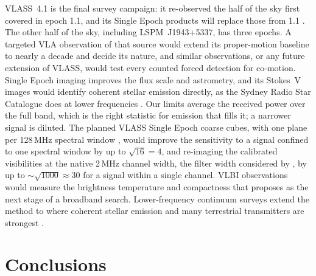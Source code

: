 \documentclass[linenumbers]{aastex702}
\begin{document}
VLASS~4.1 is the final survey campaign: it re-observed the half of the sky first covered in epoch 1.1, and its Single Epoch products will replace those from 1.1 \citep{Kimball2026}. The other half of the sky, including LSPM~J1943+5337, has three epochs. A targeted VLA observation of that source would extend its proper-motion baseline to nearly a decade and decide its nature, and similar observations, or any future extension of VLASS, would test every counted forced detection for co-motion. Single Epoch imaging improves the flux scale and astrometry, and its Stokes~V images would identify coherent stellar emission directly, as the Sydney Radio Star Catalogue does at lower frequencies \citep{Driessen2024}. Our limits average the received power over the full band, which is the right statistic for emission that fills it; a narrower signal is diluted. The planned VLASS Single Epoch coarse cubes, with one plane per 128\,MHz spectral window \citep{Kimball2026}, would improve the sensitivity to a signal confined to one spectral window by up to $\sqrt{16}=4$, and re-imaging the calibrated visibilities at the native 2\,MHz channel width, the filter width considered by \citet{Zuckerman2026}, by up to $\sim\sqrt{1000}\approx30$ for a signal within a single channel. VLBI observations would measure the brightness temperature and compactness that \citet{Garrett2026} proposes as the next stage of a broadband search. Lower-frequency continuum surveys extend the method to where coherent stellar emission and many terrestrial transmitters are strongest \citep{Callingham2021,Yiu2024}.

\section{Conclusions} \label{sec:conclusions}
\end{document}
